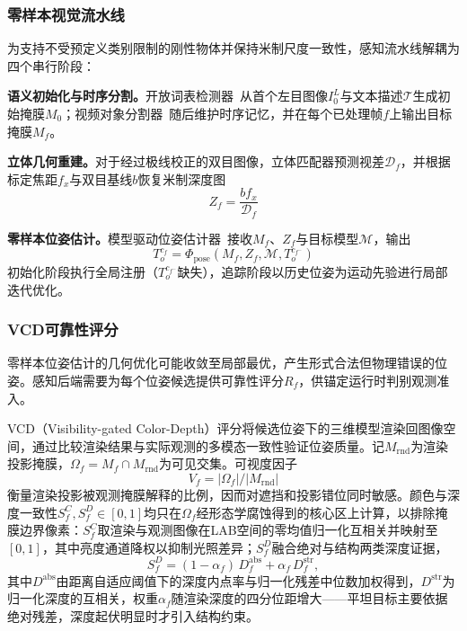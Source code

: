 \documentclass[review]{vgtc}
\begin{document}
\subsubsection{零样本视觉流水线}

为支持不受预定义类别限制的刚性物体并保持米制尺度一致性，感知流水线解耦为四个串行阶段：

\textbf{语义初始化与时序分割。}开放词表检测器~\cite{yoloe2025}从首个左目图像$I_0^L$与文本描述$\mathcal{T}$生成初始掩膜$M_0$；视频对象分割器~\cite{cutie2024}随后维护时序记忆，并在每个已处理帧$f$上输出目标掩膜$M_f$。

\textbf{立体几何重建。}对于经过极线校正的双目图像，立体匹配器预测视差$\mathcal{D}_f$，并根据标定焦距$f_x$与双目基线$b$恢复米制深度图
\begin{equation}
Z_f = \frac{b f_x}{\mathcal{D}_f}
\label{eq:depth}
\end{equation}

\textbf{零样本位姿估计。}模型驱动位姿估计器~\cite{foundationpose2023}接收$M_f$、$Z_f$与目标模型$\mathcal{M}$，输出
\begin{equation}
T_o^{c_f} = \Phi_{\mathrm{pose}}(M_f, Z_f, \mathcal{M}, T_o^{c_{f^-}})
\label{eq:pose}
\end{equation}
初始化阶段执行全局注册（$T_o^{c_{f^-}}$缺失），追踪阶段以历史位姿为运动先验进行局部迭代优化。

\subsubsection{VCD可靠性评分}

零样本位姿估计的几何优化可能收敛至局部最优，产生形式合法但物理错误的位姿。感知后端需要为每个位姿候选提供可靠性评分$R_f$，供锚定运行时判别观测准入。

VCD（Visibility-gated Color-Depth）评分将候选位姿下的三维模型渲染回图像空间，通过比较渲染结果与实际观测的多模态一致性验证位姿质量。记$M_{\mathrm{rnd}}$为渲染投影掩膜，$\Omega_f = M_f \cap M_{\mathrm{rnd}}$为可见交集。可视度因子
\begin{equation}
V_f = |\Omega_f| / |M_{\mathrm{rnd}}|
\label{eq:visibility}
\end{equation}
衡量渲染投影被观测掩膜解释的比例，因而对遮挡和投影错位同时敏感。颜色与深度一致性$S_f^C, S_f^D \in [0,1]$均只在$\Omega_f$经形态学腐蚀得到的核心区上计算，以排除掩膜边界像素：$S_f^C$取渲染与观测图像在LAB空间的零均值归一化互相关并映射至$[0,1]$，其中亮度通道降权以抑制光照差异；$S_f^D$融合绝对与结构两类深度证据，
\begin{equation}
S_f^D = (1-\alpha_f)\,D_f^{\mathrm{abs}} + \alpha_f\,D_f^{\mathrm{str}},
\label{eq:depth-score}
\end{equation}
其中$D^{\mathrm{abs}}$由距离自适应阈值下的深度内点率与归一化残差中位数加权得到，$D^{\mathrm{str}}$为归一化深度的互相关，权重$\alpha_f$随渲染深度的四分位距增大——平坦目标主要依据绝对残差，深度起伏明显时才引入结构约束。
\end{document}
